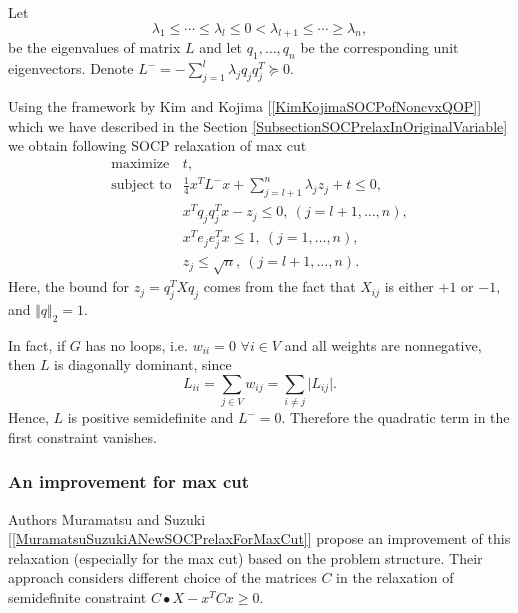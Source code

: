 \documentclass[12pt]{book}
\theoremstyle{definition}
\begin{document}
Let $$\lambda_1\leq \cdots \leq \lambda_l \leq  0 < \lambda_{l+1} \leq \cdots \geq \lambda_n, $$
be the eigenvalues of matrix $L$ and let $q_1,\dots , q_n$ be the corresponding unit eigenvectors. Denote $L^- = -\sum_{j = 1}^{l}\lambda_j q_jq_j^T\succeq 0$.


Using the framework by Kim and Kojima [\ref{KimKojimaSOCPofNoncvxQOP}] which we have described in the Section \ref{SubsectionSOCPrelaxInOriginalVariable} we obtain following SOCP relaxation of max cut
\begin{equation}
\begin{array}{ll}
\label{MaxCutSOCPRelax1}
\mbox{maximize} & t, \\
\mbox{subject to} & \frac{1}{4}x^TL^-x + \sum_{j=l+1}^n\lambda_jz_j + t \leq 0 , \\
&	x^Tq_jq_j^Tx - z_j \leq 0, \ (j = l+1,\dots ,n), \\
&  	x^Te_je_j^Tx \leq 1, \ (j = 1,\dots ,n), \\
& z_j \leq \sqrt{n}, \ (j = l+1,\dots ,n).
\end{array}
\end{equation}
Here, the bound for $z_j = q^T_jXq_j$ comes from the fact that $X_{ij}$ is either $+1$ or $-1,$ and $\Vert q \Vert_2 = 1.$

In fact, if $G$ has no loops, i.e. $w_{ii} = 0$ $\forall i\in V$ and all weights are nonnegative, then $L$ is diagonally dominant, since
$$L_{ii} = \sum_{j\in V} w_{ij} = \sum_{i\neq j} \vert L_{ij} \vert. $$
Hence, $L$ is positive semidefinite and $L^-=0.$ Therefore the quadratic term in the first constraint vanishes.



\subsubsection{An improvement for max cut}
Authors Muramatsu and Suzuki [\ref{MuramatsuSuzukiANewSOCPrelaxForMaxCut}]
propose an improvement of this relaxation (especially for the max cut) based on the problem structure. Their approach considers different choice of the matrices $C$ in the relaxation of semidefinite constraint $C\bullet X - x^TCx \geq 0$.
\end{document}
